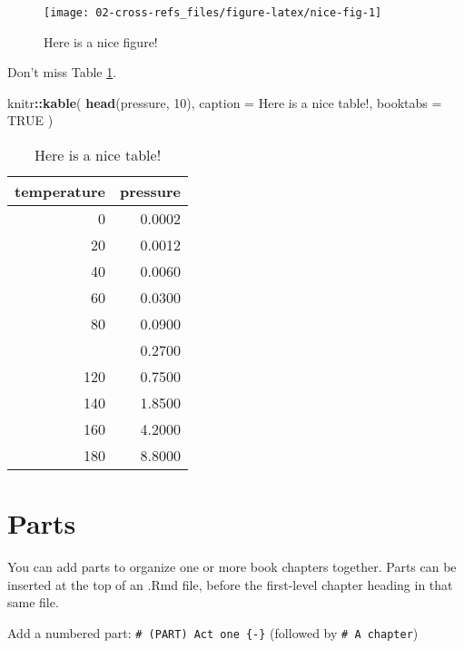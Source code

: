 \documentclass[
]{book}
\newenvironment{Shaded}{\begin{snugshade}}{\end{snugshade}}
\newcommand{\AttributeTok}[1]{\textcolor[rgb]{0.13,0.29,0.53}{#1}}
\newcommand{\ConstantTok}[1]{\textcolor[rgb]{0.56,0.35,0.01}{#1}}
\newcommand{\DecValTok}[1]{\textcolor[rgb]{0.00,0.00,0.81}{#1}}
\newcommand{\FunctionTok}[1]{\textcolor[rgb]{0.13,0.29,0.53}{\textbf{#1}}}
\newcommand{\NormalTok}[1]{#1}
\newcommand{\SpecialCharTok}[1]{\textcolor[rgb]{0.81,0.36,0.00}{\textbf{#1}}}
\newcommand{\StringTok}[1]{\textcolor[rgb]{0.31,0.60,0.02}{#1}}
\theoremstyle{definition}
\theoremstyle{definition}
\theoremstyle{definition}
\theoremstyle{definition}
\theoremstyle{remark}
\begin{document}
\begin{figure}

{\centering \texttt{[image: 02-cross-refs\_files/figure-latex/nice-fig-1]} 

}

\caption{Here is a nice figure!}\label{fig:nice-fig}
\end{figure}

Don't miss Table \ref{tab:nice-tab}.

\begin{Shaded}
\begin{Highlighting}[]
\NormalTok{knitr}\SpecialCharTok{::}\FunctionTok{kable}\NormalTok{(}
  \FunctionTok{head}\NormalTok{(pressure, }\DecValTok{10}\NormalTok{), }\AttributeTok{caption =} \StringTok{\textquotesingle{}Here is a nice table!\textquotesingle{}}\NormalTok{,}
  \AttributeTok{booktabs =} \ConstantTok{TRUE}
\NormalTok{)}
\end{Highlighting}
\end{Shaded}

\begin{table}

\caption{\label{tab:nice-tab}Here is a nice table!}
\centering
\begin{tabular}[t]{rr}
\toprule
temperature & pressure\\
\midrule
0 & 0.0002\\
20 & 0.0012\\
40 & 0.0060\\
60 & 0.0300\\
80 & 0.0900\\
\addlinespace
100 & 0.2700\\
120 & 0.7500\\
140 & 1.8500\\
160 & 4.2000\\
180 & 8.8000\\
\bottomrule
\end{tabular}
\end{table}

\hypertarget{parts}{%
\chapter{Parts}\label{parts}}

You can add parts to organize one or more book chapters together. Parts can be inserted at the top of an .Rmd file, before the first-level chapter heading in that same file.

Add a numbered part: \texttt{\#\ (PART)\ Act\ one\ \{-\}} (followed by \texttt{\#\ A\ chapter})
\end{document}
